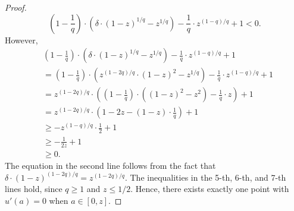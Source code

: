 \begin{proof}
\begin{equation}
    \left(1-\frac{1}{q}\right)\cdot\left(\delta\cdot(1-z)^{1/q}-z^{1/q}\right)-\frac{1}{q}\cdot z^{(1-q)/q}+1<0.
\end{equation}
However,
\begin{align*}
   &\left(1-\frac{1}{q}\right)\cdot\left(\delta\cdot(1-z)^{1/q}-z^{1/q}\right)-\frac{1}{q}\cdot z^{(1-q)/q}+1\\
   &=\left(1-\frac{1}{q}\right)\cdot\left(z^{(1-2q)/q}\cdot(1-z)^2-z^{1/q}\right)-\frac{1}{q}\cdot z^{(1-q)/q}+1\\
   &=z^{(1-2q)/q}\cdot\left(\left(1-\frac{1}{q}\right)\cdot\left((1-z)^2-z^2\right)-\frac{1}{q}\cdot z\right)+1\\
   &=z^{(1-2q)/q}\cdot\left(1-2z-(1-z)\cdot\frac{1}{q}\right)+1\\
    &\ge -z^{(1-q)/q}\cdot\frac{1}{2}+1\\
   &\ge -\frac{1}{2z}+1\\
   &\geq 0.
\end{align*}
The equation in the second line follows from the fact that $\delta\cdot(1-z)^{(1-2q)/q}=z^{(1-2q)/q}$. The inequalities in the 5-th, 6-th, and 7-th lines hold, since $q\ge 1$ and $z\leq1/2$. Hence, there exists exactly one point with $u'(a)=0$ when $a\in [0,z]$. 
\end{proof}

